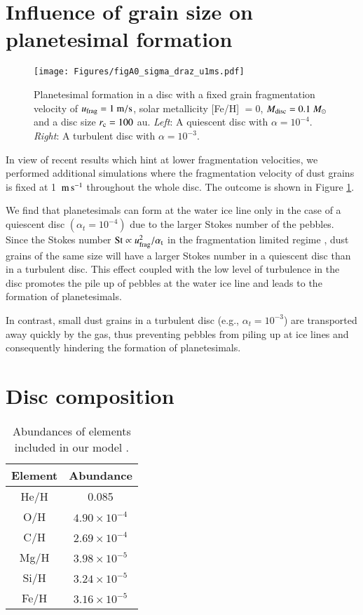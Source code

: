 \documentclass{aa}
\begin{document}
\begin{appendix} 
\section{Influence of grain size on planetesimal formation}
\label{sec:appendix_grain_size}

\begin{figure*}
   \texttt{[image: Figures/figA0\_sigma\_draz\_u1ms.pdf]}
   \caption{Planetesimal formation in a disc with a fixed grain fragmentation velocity of $u_{\rm{frag}}=1~\rm{m/s}$, solar metallicity [Fe/H] $= 0$, $M_{\rm disc} = 0.1~M_{\odot}$ and a disc size $r_{\rm c}=100$ au. {\textit{Left}}: A quiescent disc with $\alpha = 10^{-4}$. {\textit{Right}}: A turbulent disc with $\alpha = 10^{-3}$.}
   \label{fig:figA0}
\end{figure*}

 In view of recent results which hint at lower fragmentation velocities, we performed additional simulations where the fragmentation velocity of dust grains is fixed at 1~${\rm m\,s}^{-1}$ throughout the whole disc. The outcome is shown in Figure \ref{fig:figA0}.

We find that planetesimals can form at the water ice line only in the case of a quiescent disc $(\alpha_t = 10^{-4})$ due to the larger Stokes number of the pebbles. Since the Stokes number ${\rm St} \propto u_{\rm frag}^2/\alpha_{\rm t}$ in the fragmentation limited regime \citep{Birnstiel2009}, dust grains of the same size will have a larger Stokes number in a quiescent disc than in a turbulent disc. This effect coupled with the low level of turbulence in the disc promotes the pile up of pebbles at the water ice line and leads to the formation of planetesimals. 

In contrast, small dust grains in a turbulent disc (e.g., $\alpha_t = 10^{-3}$) are transported away quickly by the gas, thus preventing pebbles from piling up at ice lines and consequently hindering the formation of planetesimals.

\section{Disc composition}
\label{sec:appendix_disc_composition}

\begin{table} [h!]
\centering
    \caption{Abundances of elements included in our model \citep{Asplund2009}.}
    \label{tab:elements}
    \begin{tabular}{c c}
    \hline\hline
    Element & Abundance\\ 
    \hline
    He/H & 0.085 \\
    O/H & $4.90\times10^{-4}$ \\
    C/H & $2.69\times10^{-4}$ \\
    Mg/H & $3.98\times10^{-5}$ \\
    Si/H & $3.24\times10^{-5}$ \\
    Fe/H & $3.16\times10^{-5}$ \\
    \hline
    \end{tabular}
\end{table} 


\end{appendix}
\end{document}
